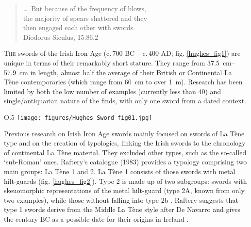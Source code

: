 \begin{quote}
\begin{flushright}
\ldots\ But because of the frequency of blows, \\
the majority of spears shattered and they\\
then engaged each other with swords.\\
{\footnotesize Diodorus Siculus, 15.86.2  }
\end{flushright}
\end{quote}
\vspace{2em}


\lettrine[nindent=0em,lines=3]{T}{he}  swords of the Irish Iron Age (c.\,700 BC – c.\,400 AD; fig. \ref{hughes_fig1}) are unique in terms of their remarkably short stature. They range from \SIrange[range-phrase= --]{37.5}{57.9}{\cm} in length, almost half the average of their British or Continental La Tène contemporaries (which range from \SI{60}{\cm} to over \SI{1}{\meter}). 
Research has been limited by both the low number of examples (currently less than \num{40}) and single/antiquarian nature of the finds, with only one sword from a dated context. 

\begin{wrapfigure}{O}{.5\textwidth}
\texttt{[image: figures/Hughes\_Sword\_fig01.jpg]} 
\caption{Distribution of Iron Age swords in Ireland and main sites mentioned in the text}
\label{hughes_fig1}
\end{wrapfigure}
Previous research on Irish Iron Age swords \parencites{Rynne1982}{Raftery1983} mainly focused on swords of La Tène type and on the creation of typologies, linking the Irish swords to the chronology of continental La Tène material. 
They excluded other types, such as the so-called ‘sub-Roman’ ones. 
Raftery’s catalogue (1983) provides a typology comprising two main groups: 
La Tène 1 and 2. La Tène 1 consists of those swords with metal hilt-guards (fig. \ref{hughes_fig2}). 
Type 2 is made up of two subgroups: 
swords with skeuomorphic representations of the metal hilt-guard (type 2A, known from only two examples), while those without falling into type 2b 
\parencite[83--106]{Raftery1983}. 
Raftery suggests that type 1 swords derive from the Middle La Tène style after De Navarro and gives the  century BC as a possible date for their origins in Ireland 
\parencites{DeNavarro1972}[83]{Raftery1983}. 

